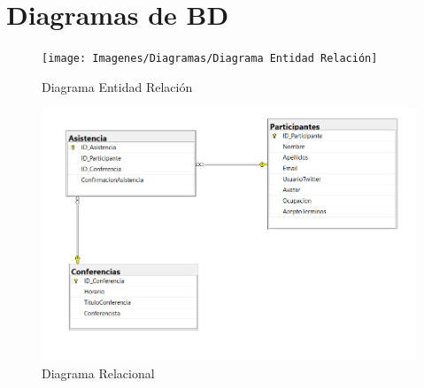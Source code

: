 \chapter{Diagramas de BD}


\begin{figure}[H]
	\centering
	\texttt{[image: Imagenes/Diagramas/Diagrama Entidad Relación]}
	\caption{Diagrama Entidad Relación}
	\label{fig:diagrama-entidad-relacion}
\end{figure}


\begin{figure}[H]
	\centering
	\includegraphics[width=0.9\linewidth]{Imagenes/Diagramas/diagrama bd}
	\caption{Diagrama Relacional}
	\label{fig:diagrama-bd}
\end{figure}
